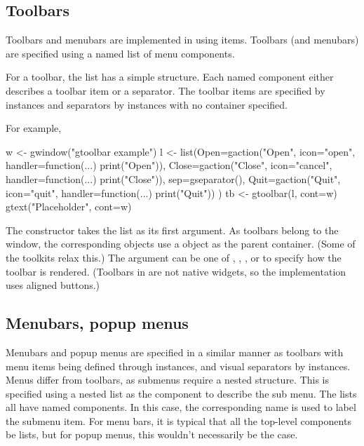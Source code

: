 \subsection{Toolbars}
\label{sec:gWidgets-toolbars}
Toolbars and menubars are implemented in  using
 items. Toolbars (and menubars) are specified using a named
list of menu components. 

For a toolbar, the list has a simple structure. Each named component
either describes a toolbar item or a separator. The toolbar items are
specified by  instances and separators by
 instances with no container specified.

For example,
\begin{Schunk}
\begin{Sinput}
 w <- gwindow("gtoolbar example")
 l <- list(Open=gaction("Open", icon="open", 
             handler=function(...) print("Open")),
           Close=gaction("Close", icon="cancel", 
             handler=function(...) print("Close")),
           sep=gseparator(),
           Quit=gaction("Quit", icon="quit", 
             handler=function(...) print("Quit"))
           )
 tb <- gtoolbar(l, cont=w)
 gtext("Placeholder", cont=w)
\end{Sinput}
\end{Schunk}


The  constructor takes the list as its first
argument.  As toolbars belong to the window, the corresponding
 objects use a  object as the
parent container. (Some of the toolkits relax this.)  The argument
 can be one of , ,
, or  to specify how the toolbar is
rendered. (Toolbars in  are not native widgets, so
the implementation uses aligned buttons.)


\subsection{Menubars, popup menus}
\label{sec:gWidgets-menubars}

Menubars and popup menus are specified in a similar manner as toolbars with menu items
being defined through  instances, and visual separators
by  instances. Menus differ from toolbars, as
submenus require a nested structure. This  is specified using a
nested list as the component to describe the sub menu. The lists all
have named components. In this case, the corresponding name is used to
label the submenu item. For menu bars, it is typical that all the
top-level components be lists, but for popup menus, this wouldn't
necessarily be the case.


